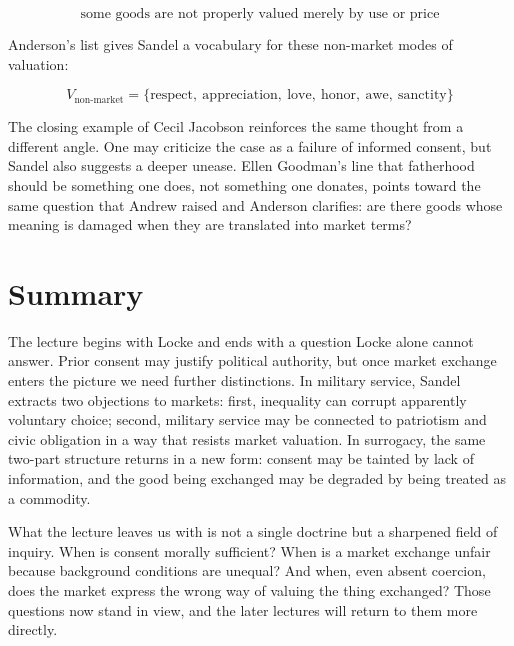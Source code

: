 \begin{equation}
\text{some goods are not properly valued merely by use or price}
\end{equation}

Anderson's list gives Sandel a vocabulary for these non-market modes of valuation:

\begin{equation}
V_{\text{non-market}}
=
\{\text{respect},\ \text{appreciation},\ \text{love},\ \text{honor},\ \text{awe},\ \text{sanctity}\}
\end{equation}

The closing example of Cecil Jacobson reinforces the same thought from a different angle. One may criticize the case as a failure of informed consent, but Sandel also suggests a deeper unease. Ellen Goodman's line that fatherhood should be something one does, not something one donates, points toward the same question that Andrew raised and Anderson clarifies: are there goods whose meaning is damaged when they are translated into market terms?

\section{Summary}

The lecture begins with Locke and ends with a question Locke alone cannot answer. Prior consent may justify political authority, but once market exchange enters the picture we need further distinctions. In military service, Sandel extracts two objections to markets: first, inequality can corrupt apparently voluntary choice; second, military service may be connected to patriotism and civic obligation in a way that resists market valuation. In surrogacy, the same two-part structure returns in a new form: consent may be tainted by lack of information, and the good being exchanged may be degraded by being treated as a commodity.

What the lecture leaves us with is not a single doctrine but a sharpened field of inquiry. When is consent morally sufficient? When is a market exchange unfair because background conditions are unequal? And when, even absent coercion, does the market express the wrong way of valuing the thing exchanged? Those questions now stand in view, and the later lectures will return to them more directly.